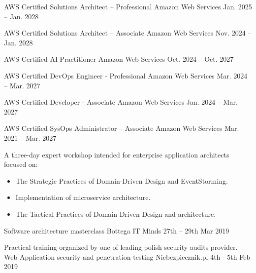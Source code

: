 

\begin{cventries}


	\cventry
    {} %
    {AWS Certified Solutions Architect – Professional} %
    {Amazon Web Services} %
    {Jan. 2025 – Jan. 2028} %
    {}   
    
    \cventry
    {} %
    {AWS Certified Solutions Architect – Associate} %
    {Amazon Web Services} %
    {Nov. 2024 – Jan. 2028} %
    {}   
    
    \cventry
    {} %
    {AWS Certified AI Practitioner} %
    {Amazon Web Services} %
    {Oct. 2024 – Oct. 2027} %
    {}
  
  \cventry
   	{} %
    {AWS Certified DevOps Engineer - Professional} %
    {Amazon Web Services} %
    {Mar. 2024 – Mar. 2027} %
    {} 

  \cventry
    {} %
    {AWS Certified Developer - Associate} %
    {Amazon Web Services} %
    {Jan. 2024 – Mar. 2027} %
    {}
    
  \cventry
    {} %
    {AWS Certified SysOps Administrator – Associate} %
    {Amazon Web Services} %
    {Mar. 2021 – Mar. 2027} %
    {}
   

  \cventry
    {A three-day expert workshop intended for enterprise application architects focused on: 
\begin{itemize}
  \item The Strategic Practices of Domain-Driven Design and EventStorming.
  \item Implementation of microservice architecture.
  \item The Tactical Practices of Domain-Driven Design and architecture. 
\end{itemize}\vspace*{-\baselineskip} } %
    {Software architecture masterclass} %
    {Bottega IT Minds} %
    {27th – 29th Mar 2019} %
    {}

  \cventry
    {Practical training organized by one of leading polish security audits provider. } %
    {Web Application security and penetration testing} %
    {Niebezpiecznik.pl} %
    {4th - 5th Feb 2019} %
    {}



    
\end{cventries}

